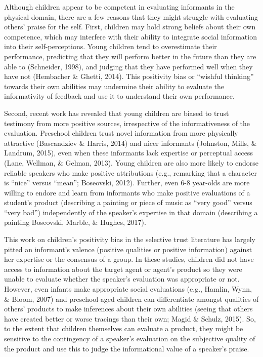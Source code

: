 \documentclass[10pt, letterpaper]{article}
\begin{document}
Although children appear to be competent in evaluating informants in the
physical domain, there are a few reasons that they might struggle with
evaluating others' praise for the self. First, children may hold strong
beliefs about their own competence, which may interfere with their
ability to integrate social information into their self-perceptions.
Young children tend to overestimate their performance, predicting that
they will perform better in the future than they are able to (Schneider,
1998), and judging that they have performed well when they have not
(Hembacher \& Ghetti, 2014). This positivity bias or ``wishful
thinking'' towards their own abilities may undermine their ability to
evaluate the informativity of feedback and use it to understand their
own performance.

Second, recent work has revealed that young children are biased to trust
testimony from more positive sources, irrespective of the
informativeness of the evaluation. Preschool children trust novel
information from more physically attractive (Bascandziev \& Harris,
2014) and nicer informants (Johnston, Mills, \& Landrum, 2015), even
when these informants lack expertise or perceptual access (Lane,
Wellman, \& Gelman, 2013). Young children are also more likely to
endorse reliable speakers who make positive attributions (e.g.,
remarking that a character is ``nice'' versus ``mean''; Boseovski,
2012). Further, even 6-8 year-olds are more willing to endore and learn
from informants who make positive evaluations of a student's product
(describing a painting or piece of music as ``very good'' versus ``very
bad'') independently of the speaker's expertise in that domain
(describing a painting Boseovski, Marble, \& Hughes, 2017).

This work on children's positivity bias in the selective trust
literature has largely pitted an informant's valence (positive qualities
or positive information) against her expertise or the consensus of a
group. In these studies, children did not have access to information
about the target agent or agent's product so they were unable to
evaluate whether the speaker's evaluation was appropriate or not.
However, even infants make appropriate social evaluations (e.g., Hamlin,
Wynn, \& Bloom, 2007) and preschool-aged children can differentiate
amongst qualities of others' products to make inferences about their own
abilities (seeing that others have created better or worse tracings than
their own; Magid \& Schulz, 2015). So, to the extent that children
themselves can evaluate a product, they might be sensitive to the
contingency of a speaker's evaluation on the subjective quality of the
product and use this to judge the informational value of a speaker's
praise.
\end{document}
